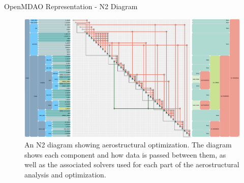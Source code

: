 \documentclass{bredelebeamer}
\begin{document}
\begin{frame}{OpenMDAO Representation - N2 Diagram}
  \begin{figure}
  \includegraphics[width=1.0\linewidth]{images/aerostruct-n2.png}
  \caption{An N2 diagram showing aerostructural optimization. The diagram shows each component and how data is passed between them, as well as the associated solvers used for each part of the aerostructural analysis and optimization.}
  \end{figure}
\end{frame}
\end{document}
